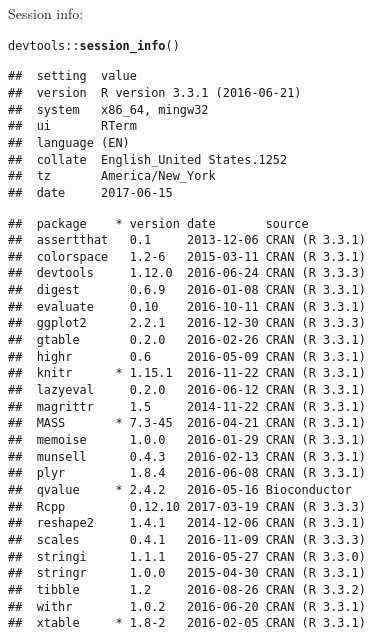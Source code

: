 \documentclass{article}\usepackage[]{graphicx}\usepackage[]{color}
\makeatletter
\newcommand{\hlopt}[1]{\textcolor[rgb]{0,0,0}{#1}}%
\newcommand{\hlstd}[1]{\textcolor[rgb]{0.345,0.345,0.345}{#1}}%
\newcommand{\hlkwd}[1]{\textcolor[rgb]{0.737,0.353,0.396}{\textbf{#1}}}%
\newenvironment{kframe}{%
 \def\at@end@of@kframe{}%
 \ifinner\ifhmode%
  \def\at@end@of@kframe{\end{minipage}}%
  \begin{minipage}{\columnwidth}%
 \fi\fi%
 \def\FrameCommand##1{\hskip\@totalleftmargin \hskip-\fboxsep
 \colorbox{shadecolor}{##1}\hskip-\fboxsep
     \hskip-\linewidth \hskip-\@totalleftmargin \hskip\columnwidth}%
 \MakeFramed {\advance\hsize-\width
   \@totalleftmargin\z@ \linewidth\hsize
   \@setminipage}}%
 {\par\unskip\endMakeFramed%
 \at@end@of@kframe}
\newenvironment{knitrout}{}{} %
\makeatother
\begin{document}
Session info:
\begin{knitrout}
\color{fgcolor}\begin{kframe}
\begin{alltt}
\hlstd{devtools}\hlopt{::}\hlkwd{session_info}\hlstd{()}
\end{alltt}


{\ttfamily\noindent\itshape\color{messagecolor}{\#\# Session info -----------------------------------------------}}\begin{verbatim}
##  setting  value                       
##  version  R version 3.3.1 (2016-06-21)
##  system   x86_64, mingw32             
##  ui       RTerm                       
##  language (EN)                        
##  collate  English_United States.1252  
##  tz       America/New_York            
##  date     2017-06-15
\end{verbatim}


{\ttfamily\noindent\itshape\color{messagecolor}{\#\# Packages ---------------------------------------------------}}\begin{verbatim}
##  package    * version date       source        
##  assertthat   0.1     2013-12-06 CRAN (R 3.3.1)
##  colorspace   1.2-6   2015-03-11 CRAN (R 3.3.1)
##  devtools     1.12.0  2016-06-24 CRAN (R 3.3.3)
##  digest       0.6.9   2016-01-08 CRAN (R 3.3.1)
##  evaluate     0.10    2016-10-11 CRAN (R 3.3.1)
##  ggplot2      2.2.1   2016-12-30 CRAN (R 3.3.3)
##  gtable       0.2.0   2016-02-26 CRAN (R 3.3.1)
##  highr        0.6     2016-05-09 CRAN (R 3.3.1)
##  knitr      * 1.15.1  2016-11-22 CRAN (R 3.3.1)
##  lazyeval     0.2.0   2016-06-12 CRAN (R 3.3.1)
##  magrittr     1.5     2014-11-22 CRAN (R 3.3.1)
##  MASS       * 7.3-45  2016-04-21 CRAN (R 3.3.1)
##  memoise      1.0.0   2016-01-29 CRAN (R 3.3.1)
##  munsell      0.4.3   2016-02-13 CRAN (R 3.3.1)
##  plyr         1.8.4   2016-06-08 CRAN (R 3.3.1)
##  qvalue     * 2.4.2   2016-05-16 Bioconductor  
##  Rcpp         0.12.10 2017-03-19 CRAN (R 3.3.3)
##  reshape2     1.4.1   2014-12-06 CRAN (R 3.3.1)
##  scales       0.4.1   2016-11-09 CRAN (R 3.3.3)
##  stringi      1.1.1   2016-05-27 CRAN (R 3.3.0)
##  stringr      1.0.0   2015-04-30 CRAN (R 3.3.1)
##  tibble       1.2     2016-08-26 CRAN (R 3.3.2)
##  withr        1.0.2   2016-06-20 CRAN (R 3.3.1)
##  xtable     * 1.8-2   2016-02-05 CRAN (R 3.3.1)
\end{verbatim}
\end{kframe}
\end{knitrout}
\end{document}
